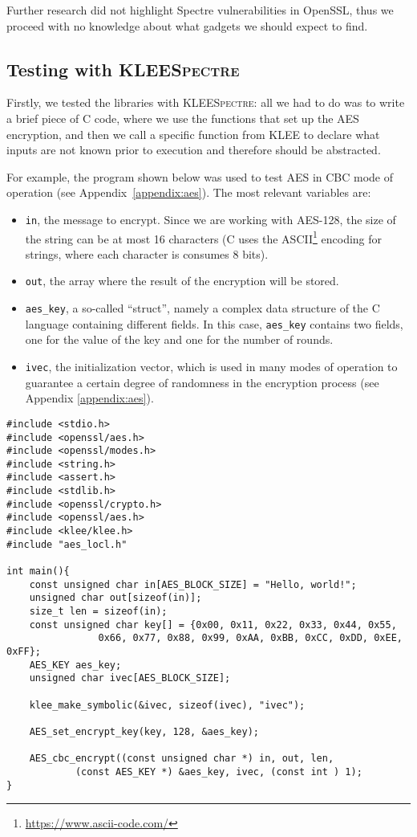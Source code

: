 \documentclass[target=mst,aauheader=aics]{thud}
\theoremstyle{definition}
\begin{document}
	Further research did not highlight Spectre vulnerabilities in OpenSSL, thus we proceed with no knowledge about what gadgets we should expect to find.
    
	\subsection{Testing with \textsc{KLEESpectre}}
	Firstly, we tested the libraries with \textsc{\textsc{\textsc{KLEESpectre}}}: all we had to do was to write a brief piece of C code, where we use the functions that set up the AES encryption, and then we call a specific function from \textsc{KLEE} to declare what inputs are not known prior to execution and therefore should be abstracted.
	
	For example, the program shown below was used to test AES in CBC mode of operation (see Appendix~\ref{appendix:aes}). The most relevant variables are:
	\begin{itemize}
		\item \texttt{in}, the message to encrypt. Since we are working with AES-128, the size of the string can be at most 16 characters (C uses the ASCII\footnote{\url{https://www.ascii-code.com/}} encoding for strings, where each character is consumes 8 bits).
		\item \texttt{out}, the array where the result of the encryption will be stored.
		\item \texttt{aes\_key}, a so-called ``struct'', namely a complex data structure of the C language containing different fields. In this case, \texttt{aes\_key} contains two fields, one for the value of the key and one for the number of rounds.
		\item \texttt{ivec}, the initialization vector, which is used in many modes of operation to guarantee a certain degree of randomness in the encryption process (see Appendix \ref{appendix:aes}).
	\end{itemize}
	
	\begin{minipage}{\textwidth}
	\begin{lstlisting}[caption=\texttt{testing\_AES\_CBC.c}, label=test-aes-cbc]
#include <stdio.h>
#include <openssl/aes.h>
#include <openssl/modes.h>
#include <string.h>
#include <assert.h>
#include <stdlib.h>
#include <openssl/crypto.h>
#include <openssl/aes.h>
#include <klee/klee.h>
#include "aes_locl.h"

int main(){
	const unsigned char in[AES_BLOCK_SIZE] = "Hello, world!";
	unsigned char out[sizeof(in)];
	size_t len = sizeof(in);
	const unsigned char key[] = {0x00, 0x11, 0x22, 0x33, 0x44, 0x55,
				0x66, 0x77, 0x88, 0x99, 0xAA, 0xBB, 0xCC, 0xDD, 0xEE, 0xFF};
	AES_KEY aes_key;
	unsigned char ivec[AES_BLOCK_SIZE];	
	
	klee_make_symbolic(&ivec, sizeof(ivec), "ivec");
			
	AES_set_encrypt_key(key, 128, &aes_key);
			
	AES_cbc_encrypt((const unsigned char *) in, out, len, 
			(const AES_KEY *) &aes_key, ivec, (const int ) 1);
}
	\end{lstlisting}
	\end{minipage}
	\vspace{3mm}
\end{document}
